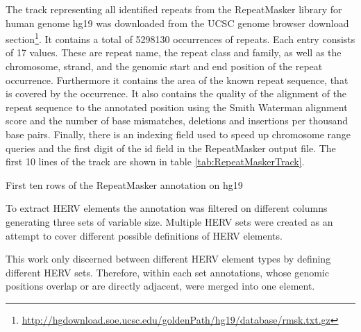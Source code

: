 \documentclass[a4paper,12pt,twoside,openright]{article}
\begin{document}
The track representing all identified repeats from the RepeatMasker library for human genome hg19 was downloaded from the UCSC genome browser download section\footnote{\url{http://hgdownload.soe.ucsc.edu/goldenPath/hg19/database/rmsk.txt.gz}}. It contains a total of 5298130 occurrences of repeats. Each entry consists of 17 values. These are repeat name, the repeat class and family, as well as the chromosome, strand, and the genomic start and end position of the repeat occurrence. Furthermore it contains the area of the known repeat sequence, that is covered by the occurrence. It also contains the quality of the alignment of the repeat sequence to the annotated position using the Smith Waterman alignment score\cite{SMITH1981195} and the number of base mismatches, deletions and insertions per thousand base pairs. Finally, there is an indexing field used to speed up chromosome range queries and the first digit of the id field in the RepeatMasker output file. The first 10 lines of the track are shown in table \ref{tab:RepeatMaskerTrack}.

\begin{table}[b]
\centering
\label{tab:RepeatMaskerTrack}
\caption{First ten rows of the RepeatMasker annotation on hg19}
\end{table}

To extract HERV elements the annotation was filtered on different columns generating three sets of variable size. Multiple HERV sets were created as an attempt to cover different possible definitions of HERV elements.

This work only discerned between different HERV element types by defining different HERV sets. Therefore, within each set annotations, whose genomic positions overlap or are directly adjacent, were merged into one element.
\end{document}
